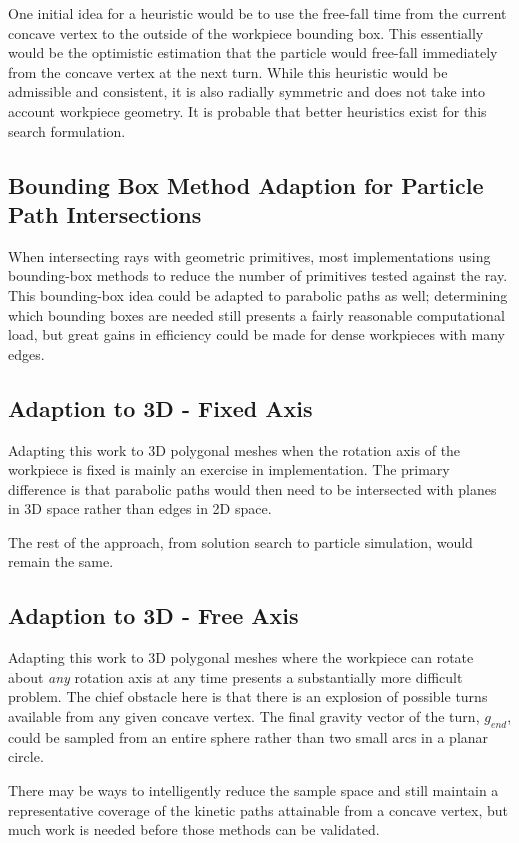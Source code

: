 One initial idea for a heuristic would be to use the free-fall time from the current concave vertex to the outside of the workpiece bounding box. This essentially would be the optimistic estimation that the particle would free-fall immediately from the concave vertex at the next turn. While this heuristic would be admissible and consistent, it is also radially symmetric and does not take into account workpiece geometry. It is probable that better heuristics exist for this search formulation.

  \subsection{Bounding Box Method Adaption for Particle Path Intersections}

When intersecting rays with geometric primitives, most implementations using bounding-box methods to reduce the number of primitives tested against the ray. This bounding-box idea could be adapted to parabolic paths as well; determining which bounding boxes are needed still presents a fairly reasonable computational load, but great gains in efficiency could be made for dense workpieces with many edges.

  \subsection{Adaption to 3D - Fixed Axis}

Adapting this work to 3D polygonal meshes when the rotation axis of the workpiece is fixed is mainly an exercise in implementation. The primary difference is that parabolic paths would then need to be intersected with planes in 3D space rather than edges in 2D space.

The rest of the approach, from solution search to particle simulation, would remain the same.

  \subsection{Adaption to 3D - Free Axis}

Adapting this work to 3D polygonal meshes where the workpiece can rotate about \emph{any} rotation axis at any time presents a substantially more difficult problem. The chief obstacle here is that there is an explosion of possible turns available from any given concave vertex. The final gravity vector of the turn, $g_{end}$, could be sampled from an entire sphere rather than two small arcs in a planar circle.

There may be ways to intelligently reduce the sample space and still maintain a representative coverage of the kinetic paths attainable from a concave vertex, but much work is needed before those methods can be validated.

